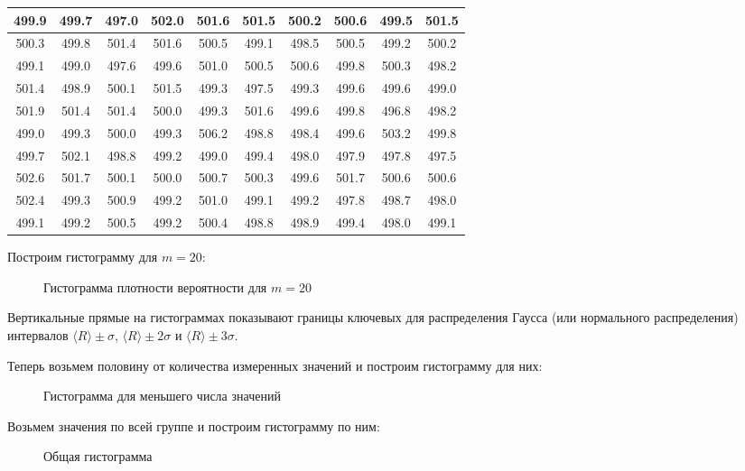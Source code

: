 \documentclass[12pt]{article}
\begin{document}
\begin{table}[]
\begin{tabular}{|c|c|c|c|c|c|c|c|c|c|}
        499.9 & 499.7 & 497.0 & 502.0 & 501.6 & 501.5 & 500.2 & 500.6 & 499.5 & 501.5 \\ \hline
        500.3 & 499.8 & 501.4 & 501.6 & 500.5 & 499.1 & 498.5 & 500.5 & 499.2 & 500.2 \\ \hline
        499.1 & 499.0 & 497.6 & 499.6 & 501.0 & 500.5 & 500.6 & 499.8 & 500.3 & 498.2 \\ \hline
        501.4 & 498.9 & 500.1 & 501.5 & 499.3 & 497.5 & 499.3 & 499.6 & 499.6 & 499.0 \\ \hline
        501.9 & 501.4 & 501.4 & 500.0 & 499.3 & 501.6 & 499.6 & 499.8 & 496.8 & 498.2 \\ \hline
        499.0 & 499.3 & 500.0 & 499.3 & 506.2 & 498.8 & 498.4 & 499.6 & 503.2 & 499.8 \\ \hline
        499.7 & 502.1 & 498.8 & 499.2 & 499.0 & 499.4 & 498.0 & 497.9 & 497.8 & 497.5 \\ \hline
        502.6 & 501.7 & 500.1 & 500.0 & 500.7 & 500.3 & 499.6 & 501.7 & 500.6 & 500.6 \\ \hline
        502.4 & 499.3 & 500.9 & 499.2 & 501.0 & 499.1 & 499.2 & 497.8 & 498.7 & 498.0 \\ \hline
        499.1 & 499.2 & 500.5 & 499.2 & 500.4 & 498.8 & 498.9 & 499.4 & 498.0 & 499.1 \\ \hline
        \end{tabular}
    \end{table}

    Построим гистограмму для $m = 20$:
    \begin{figure}[H]
        \centering
        
        \caption{Гистограмма плотности вероятности для $m = 20$}
    \end{figure}

    \par Вертикальные прямые на гистограммах показывают границы ключевых
    для распределения Гаусса (или нормального распределения) интервалов
    $\langle R \rangle \pm \sigma$, $\langle R \rangle \pm 2\sigma$ и
    $\langle R \rangle \pm 3\sigma$.
    \par Теперь возьмем половину от количества измеренных значений и построим
    гистограмму для них:
    \begin{figure}[H]
        \centering
        
        \caption{Гистограмма для меньшего числа значений}
    \end{figure}
    Возьмем значения по всей группе и построим гистограмму по
    ним:
    \begin{figure}[H]
        \centering
        \caption{Общая гистограмма}
        
    \end{figure}
\end{document}
